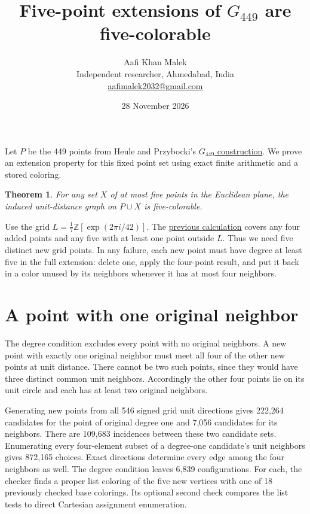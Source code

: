 \documentclass[11pt,letterpaper]{article}
\title{Five-point extensions of \(G_{449}\) are five-colorable}
\author{Aafi Khan Malek\\ \small Independent researcher, Ahmedabad, India\\
\small\href{mailto:aafimalek2032@gmail.com}{aafimalek2032@gmail.com}}
\date{28 November 2026}
\newtheorem{theorem}{Theorem}
\begin{document}
\maketitle
Let \(P\) be the 449 points from Heule and Przybocki's
\href{https://arxiv.org/abs/2611.28518}{\(G_{449}\) construction}.
We prove an extension property for this fixed point set using
exact finite arithmetic and a stored coloring.

\begin{theorem}
For any set \(X\) of at most five points in the Euclidean plane,
the induced unit-distance graph on \(P\cup X\) is five-colorable.
\end{theorem}

Use the grid \(L=\tfrac17\mathbb Z[\exp(2\pi i/42)]\). The
\href{https://github.com/Aafimalek/novel-discoveries/blob/1c624e99b4c05f24b89d26ee941a62d7bd959fc0/hadwiger-nelson/verification/g449/prime-seven-catalogue/four-five-point-extensions/paper/four-point-extensions.pdf}
{previous calculation} covers any four added points and any five
with at least one point outside \(L\). Thus we need five distinct
new grid points. In any failure, each new point must have degree at
least five in the full extension: delete one, apply the four-point
result, and put it back in a color unused by its neighbors whenever
it has at most four neighbors.

\section{A point with one original neighbor}
The degree condition excludes every point with no original
neighbors. A new point with exactly one original neighbor
must meet all four of the other new points at unit distance.
There cannot be two such points, since they would have
three distinct common unit neighbors. Accordingly the other
four points lie on its unit circle and each has at least two
original neighbors.

Generating new points from all 546 signed grid unit directions
gives 222,264 candidates for the point of original degree one
and 7,056 candidates for its neighbors. There are 109,683
incidences between these two candidate sets. Enumerating every
four-element subset of a degree-one candidate's unit neighbors
gives 872,165 choices. Exact directions determine every edge
among the four neighbors as well. The degree condition leaves
6,839 configurations. For each, the checker finds a proper
list coloring of the five new vertices with one of 18
previously checked base colorings. Its optional second check
compares the list tests to direct Cartesian assignment enumeration.
\end{document}
